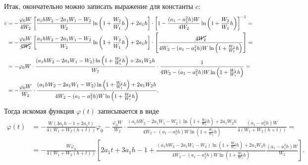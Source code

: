 \documentclass[a4paper,14pt]{article}
\begin{document}
Итак, окончательно можно записать выражение для константы $c$:
\begin{equation*}
  \begin{aligned}
    c
    &=
      - \frac{\varphi_0 W}{4 W_2} \left[
      \frac{a_1 h W_2 - 2 a_1 W_1 - W_2}{W_2}
      \ln \left( 1 +  \frac{W_2}{W_1} h \right)
      +
      2 a_1 h
      \right]
      \cdot {\left[
      1 -
      \frac{(a_1 - a_1^2 h) W}{4 W_2}
      \ln \left( 1 + \frac{W_2}{W_1} h \right)
      \right]}^{-1}
      = \\
    &=
      - \frac{\varphi_0 W}{\cancel{4 W_2}} \left[
      \frac{a_1 h W_2 - 2 a_1 W_1 - W_2}{W_2}
      \ln \left( 1 +  \frac{W_2}{W_1} h \right)
      +
      2 a_1 h
      \right]
      \cdot \left[
      \frac{\cancel{4 W_2}}{4 W_2 - (a_1 - a_1^2 h) W
      \ln \left( 1 + \frac{W_2}{W_1} h \right)
      }
      \right]
      = \\
    &=
      - \varphi_0 W \cdot
      \frac{
      \left(a_1 h W_2 - 2 a_1 W_1 - W_2 \right)
      \ln \left( 1 +  \frac{W_2}{W_1} h \right)
      + 2 a_1 W_2 h
      }{W_2}
      \cdot
      \frac{1}{4 W_2 - (a_1 - a_1^2 h) W
      \ln \left( 1 + \frac{W_2}{W_1} h \right)
      }
      = \\
    &=
      - \frac{\varphi_0 W}{W_2}
      \cdot
      \frac{
      \left(a_1 h W_2 - 2 a_1 W_1 - W_2 \right)
      \ln \left( 1 +  \frac{W_2}{W_1} h \right)
      + 2 a_1 W_2 h
      }{4 W_2 - (a_1 - a_1^2 h) W
      \ln \left( 1 + \frac{W_2}{W_1} h \right)
      }.
  \end{aligned}
\end{equation*}
Тогда искомая функция $\varphi(t)$ записывается в виде
\begin{equation*}
  \begin{aligned}
    \varphi(t)
    &=
      -\frac{W (3 a_1 h - 1 + 2 a_1 t)}{4 (W_1 + W_2 (h + t))} \varphi_0
      - \frac{\varphi_0 W}{W_2}
      \cdot
      \frac{
      \left(a_1 h W_2 - 2 a_1 W_1 - W_2 \right)
      \ln \left( 1 +  \frac{W_2}{W_1} h \right)
      + 2 a_1 W_2 h
      }{4 W_2 - (a_1 - a_1^2 h) W
      \ln \left( 1 + \frac{W_2}{W_1} h \right)
      }
      \frac{(a_1 - a_1^2 h) W}{4 (W_1 + W_2 (h + t))}
      = \\
    &=
      - \frac{W \varphi_0}{4 (W_1 + W_2(h + t))}
      \left[
      2 a_1 t + 3 a_1 h - 1
      +
      \frac{
      \left(a_1 h W_2 - 2 a_1 W_1 - W_2 \right)
      \ln \left( 1 +  \frac{W_2}{W_1} h \right)
      + 2 a_1 W_2 h
      }{4 W_2 - (a_1 - a_1^2 h) W
      \ln \left( 1 + \frac{W_2}{W_1} h \right)
      }
      \frac{(a_1 - a_1^2 h) W}{W_2}
      \right].
  \end{aligned}
\end{equation*}
\end{document}
